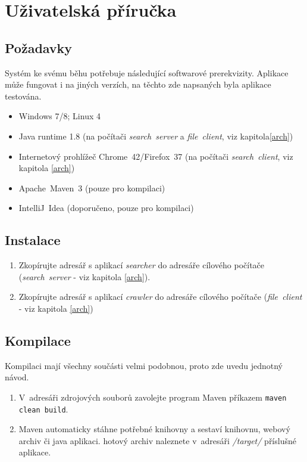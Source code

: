 \chapter{Uživatelská příručka}
\section{Požadavky}
Systém ke svému běhu potřebuje následující softwarové prerekvizity. Aplikace může fungovat i na jiných verzích, na těchto zde napsaných byla aplikace testována.
\begin{itemize}
\item Windows 7/8; Linux 4
\item Java runtime 1.8 (na počítači \emph{search~server} a \emph{file~client}, viz kapitola\ref{arch})
\item Internetový prohlížeč Chrome~42/Firefox~37 (na počítači \emph{search~client}, viz kapitola \ref{arch})
\item Apache~Maven~3 (pouze pro kompilaci)
\item IntelliJ~Idea (doporučeno, pouze pro kompilaci)
\end{itemize}

\section{Instalace}
\begin{enumerate}
\item Zkopírujte adresář s aplikací \emph{searcher} do adresáře cílového počítače (\emph{search~server} - viz kapitola \ref{arch}).
\item Zkopírujte adresář s aplikací \emph{crawler} do adresáře cílového počítače (\emph{file~client} - viz kapitola \ref{arch})
\end{enumerate}

\section{Kompilace}
Kompilaci mají všechny součásti velmi podobnou, proto zde uvedu jednotný návod.
\begin{enumerate}
\item V~adresáři zdrojových souborů zavolejte program Maven příkazem \verb|maven clean build|.
\item Maven automaticky stáhne potřebné knihovny a sestaví knihovnu, webový archiv či java aplikaci. hotový archiv naleznete v~adresáři \emph{/target/} příslušné aplikace.
\end{enumerate} 

